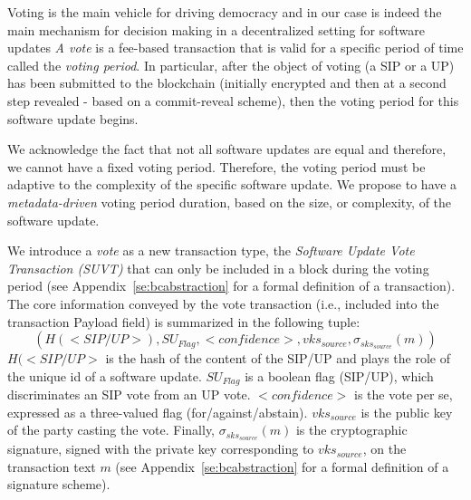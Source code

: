 Voting is the main vehicle for driving democracy and in our case is indeed the main mechanism for decision making in a decentralized setting for software updates
\emph{A vote} is a fee-based transaction that is valid for a specific period of time called the \emph{voting period}. In particular, after the object of voting (a SIP or a UP) has been submitted to the blockchain (initially encrypted and then at a second step revealed - based on a commit-reveal scheme),%
then the voting period for this software update begins.

We acknowledge the fact that not all software updates are equal and therefore, we cannot have a fixed voting period. %
Therefore, the voting period must be adaptive to the complexity of the specific software update. We propose to have a \emph{metadata-driven} voting period duration, based on the size, or complexity, of the software update.%

We introduce a \emph{vote} as a new transaction type, the \emph{Software Update Vote Transaction (SUVT)} that can only be included in a block during the voting period (see Appendix~\ref{se:bcabstraction} for a formal definition of a transaction). The core information conveyed by the vote transaction (i.e., included into the transaction Payload field) is summarized in the following tuple:
$$( H(<SIP/UP>),SU_{Flag},<confidence>,vks_{source},\sigma_{sks_{source}}(m))$$
$H(<SIP/UP>$ is the hash of the content of the SIP/UP and plays the role of the unique id of a software update. $SU_{Flag}$ is a boolean flag (SIP/UP), which discriminates an SIP vote from an UP vote. $<confidence>$ is the vote per se, expressed as a three-valued flag (for/against/abstain). $vks_{source}$ is the public key of the party casting the vote. Finally, $\sigma_{sks_{source}}(m)$ is the cryptographic signature, signed with the private key corresponding to $vks_{source}$, on the transaction text $m$ (see Appendix~\ref{se:bcabstraction} for a formal definition of a signature scheme).

